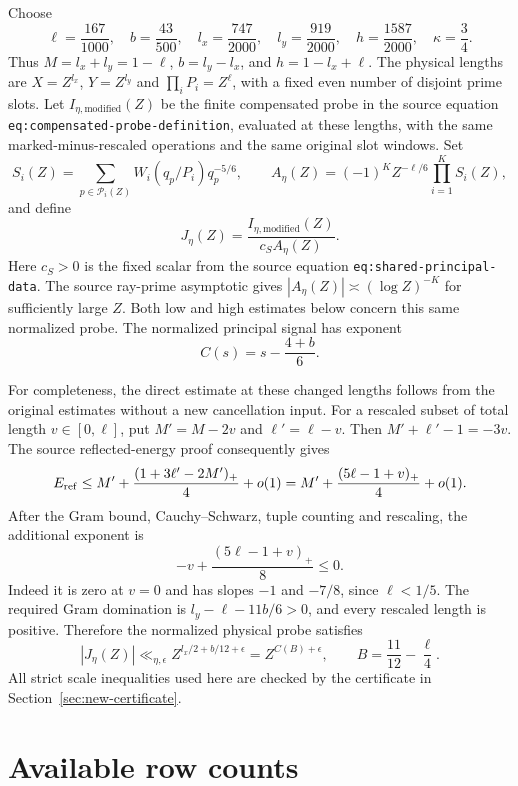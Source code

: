 \documentclass[11pt]{article}
\begin{document}
Choose
\begin{equation}\label{eq:new-geometry}
 \ell=\frac{167}{1000},\quad b=\frac{43}{500},\quad
 l_x=\frac{747}{2000},\quad l_y=\frac{919}{2000},\quad
 h=\frac{1587}{2000},\quad \kappa=\frac34.
\end{equation}
Thus $M=l_x+l_y=1-\ell$, $b=l_y-l_x$, and $h=1-l_x+\ell$.
The physical lengths are $X=Z^{l_x}$, $Y=Z^{l_y}$ and
$\prod_iP_i=Z^\ell$, with a fixed even number of disjoint prime slots.
Let $I_{\eta,\mathrm{modified}}(Z)$ be the finite compensated probe
in the source equation \texttt{eq:compensated-probe-definition},
evaluated at these lengths, with the same marked-minus-rescaled
operations and the same original slot windows. Set
\[
 S_i(Z)=\sum_{p\in\mathcal P_i(Z)}W_i(q_p/P_i)q_p^{-5/6},\qquad
 A_\eta(Z)=(-1)^K Z^{-\ell/6}\prod_{i=1}^K S_i(Z),
\]
and define
\[
 J_\eta(Z)=\frac{I_{\eta,\mathrm{modified}}(Z)}{c_S A_\eta(Z)}.
\]
Here $c_S>0$ is the fixed scalar from the source equation
\texttt{eq:shared-principal-data}. The source ray-prime asymptotic gives
$|A_\eta(Z)|\asymp(\log Z)^{-K}$ for sufficiently large $Z$.
Both low and high estimates below concern this same normalized probe.
The normalized principal signal has exponent
\[
 C(s)=s-\frac{4+b}{6}.
\]

For completeness, the direct estimate at these changed lengths follows
from the original estimates without a new cancellation input. For a
rescaled subset of total length $v\in[0,\ell]$, put
$M'=M-2v$ and $\ell'=\ell-v$. Then
$M'+\ell'-1=-3v$. The source reflected-energy proof consequently gives
\[
 E_{\rm ref}\le M'+\frac{(1+3\ell'-2M')_+}{4}+o(1)
 =M'+\frac{(5\ell-1+v)_+}{4}+o(1).
\]
After the Gram bound, Cauchy--Schwarz, tuple counting and rescaling, the
additional exponent is
\[
 -v+\frac{(5\ell-1+v)_+}{8}\le0.
\]
Indeed it is zero at $v=0$ and has slopes $-1$ and $-7/8$, since
$\ell<1/5$. The required Gram domination is
$l_y-\ell-11b/6>0$, and every rescaled length is positive. Therefore
the normalized physical probe satisfies
\begin{equation}\label{eq:new-low}
 |J_\eta(Z)|\ll_{\eta,\epsilon}Z^{l_x/2+b/12+\epsilon}
 =Z^{C(B)+\epsilon},\qquad B=\frac{11}{12}-\frac\ell4.
\end{equation}
All strict scale inequalities used here are checked by the certificate
in Section~\ref{sec:new-certificate}.

\section{Available row counts}\label{sec:row-counts}
\end{document}
